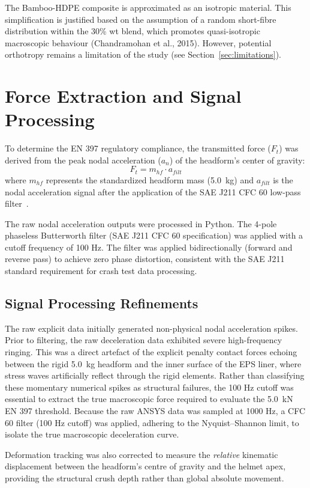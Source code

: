 The Bamboo-HDPE composite is approximated as an isotropic material. This 
simplification is justified based on the assumption of a random 
short-fibre distribution within the 30\% wt blend, which promotes 
quasi-isotropic macroscopic behaviour (Chandramohan et al., 2015). However, 
potential orthotropy remains a limitation of the study (see 
Section~\ref{sec:limitations}).

\section{Force Extraction and Signal Processing}

To determine the EN 397 regulatory compliance, the transmitted force ($F_t$) was derived from the peak nodal acceleration ($a_n$) of the headform's center of gravity:
\begin{equation}
    F_t = m_{hf} \cdot a_{filt}
\end{equation}
where $m_{hf}$ represents the standardized headform mass (5.0~kg) and $a_{filt}$ is the nodal acceleration signal after the application of the SAE J211 CFC 60 low-pass filter~\cite{sae1995}.


The raw nodal acceleration outputs were processed in Python. The 4-pole 
phaseless Butterworth filter (SAE J211 CFC 60 specification) was applied 
with a cutoff frequency of 100 Hz. The filter was applied bidirectionally 
(forward and reverse pass) to achieve zero phase distortion, consistent 
with the SAE J211 standard requirement for crash test data processing.

\subsection{Signal Processing Refinements}
The raw explicit data initially generated non-physical nodal acceleration spikes. Prior to filtering, the raw deceleration data exhibited severe high-frequency ringing. This was a direct artefact of the explicit penalty contact forces echoing between the rigid 5.0~kg headform and the inner surface of the EPS liner, where stress waves artificially reflect through the rigid elements. Rather than classifying these momentary numerical spikes as structural failures, the 100 Hz cutoff was essential to extract the true macroscopic force required to evaluate the 5.0~kN EN 397 threshold.
Because the raw ANSYS data was sampled at 1000 Hz, a CFC 60 filter (100 Hz 
cutoff) was applied, adhering to the Nyquist--Shannon limit, to 
isolate the true macroscopic deceleration curve.

Deformation tracking was also corrected to measure the \textit{relative} 
kinematic displacement between the headform's centre of gravity and the 
helmet apex, providing the structural crush depth rather than global 
absolute movement.
